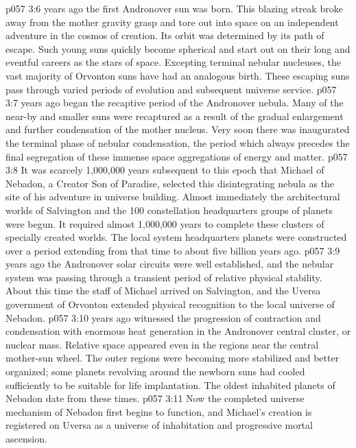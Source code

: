 \vs p057 3:6 \pc {} years ago the first Andronover sun was born. This blazing streak broke away from the mother gravity grasp and tore out into space on an independent adventure in the cosmos of creation. Its orbit was determined by its path of escape. Such young suns quickly become spherical and start out on their long and eventful careers as the stars of space. Excepting terminal nebular nucleuses, the vast majority of Orvonton suns have had an analogous birth. These escaping suns pass through varied periods of evolution and subsequent universe service.
\vs p057 3:7 \pc {} years ago began the recaptive period of the Andronover nebula. Many of the near\hyp{}by and smaller suns were recaptured as a result of the gradual enlargement and further condensation of the mother nucleus. Very soon there was inaugurated the terminal phase of nebular condensation, the period which always precedes the final segregation of these immense space aggregations of energy and matter.
\vs p057 3:8 It was scarcely 1,000,000 years subsequent to this epoch that Michael of Nebadon, a Creator Son of Paradise, selected this disintegrating nebula as the site of his adventure in universe building. Almost immediately the architectural worlds of Salvington and the 100 constellation headquarters groups of planets were begun. It required almost 1,000,000 years to complete these clusters of specially created worlds. The local system headquarters planets were constructed over a period extending from that time to about five billion years ago.
\vs p057 3:9 \pc {} years ago the Andronover solar circuits were well established, and the nebular system was passing through a transient period of relative physical stability. About this time the staff of Michael arrived on Salvington, and the Uversa government of Orvonton extended physical recognition to the local universe of Nebadon.
\vs p057 3:10 \pc {} years ago witnessed the progression of contraction and condensation with enormous heat generation in the Andronover central cluster, or nuclear mass. Relative space appeared even in the regions near the central mother\hyp{}sun wheel. The outer regions were becoming more stabilized and better organized; some planets revolving around the newborn suns had cooled sufficiently to be suitable for life implantation. The oldest inhabited planets of Nebadon date from these times.
\vs p057 3:11 Now the completed universe mechanism of Nebadon first begins to function, and Michael’s creation is registered on Uversa as a universe of inhabitation and progressive mortal ascension.
